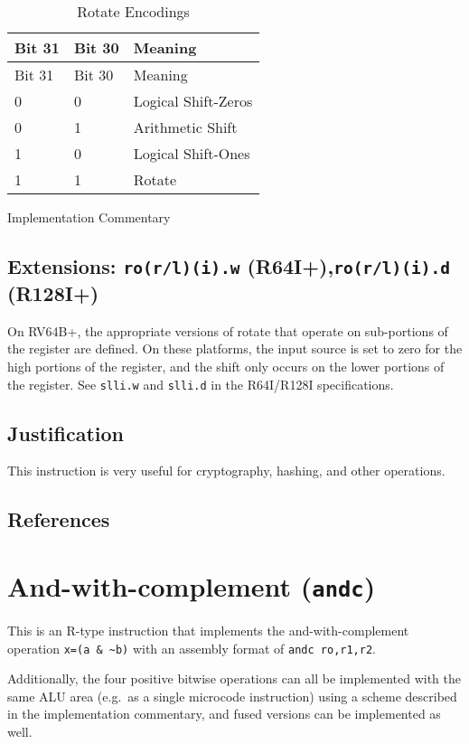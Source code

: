 \begin{longtable}[c]{@{}lll@{}}
\caption{Rotate Encodings}\tabularnewline
\toprule
Bit 31 & Bit 30 & Meaning\tabularnewline
\midrule
\endfirsthead
\toprule
Bit 31 & Bit 30 & Meaning\tabularnewline
\midrule
\endhead
0 & 0 & Logical Shift-Zeros\tabularnewline
0 & 1 & Arithmetic Shift\tabularnewline
1 & 0 & Logical Shift-Ones\tabularnewline
1 & 1 & Rotate\tabularnewline
\bottomrule
\end{longtable}

Implementation Commentary

\subsection{Extensions: \texttt{ro(r/l)(i).w} (R64I+),\texttt{ro(r/l)(i).d} (R128I+)}

On RV64B+, the appropriate versions of rotate that operate on
sub-portions of the register are defined. On these platforms, the input
source is set to zero for the high portions of the register, and the
shift only occurs on the lower portions of the register. See
\texttt{slli.w} and \texttt{slli.d} in the R64I/R128I specifications.

\subsection{Justification}

This instruction is very useful for cryptography, hashing, and other
operations.

\subsection{References}


\section{And-with-complement (\texttt{andc})}



This is an R-type instruction that implements the and-with-complement
operation \texttt{x=(a\ \&\ \textasciitilde{}b)} with an assembly format
of \texttt{andc\ ro,r1,r2}.

Additionally, the four positive bitwise operations can all be
implemented with the same ALU area (e.g.~as a single microcode
instruction) using a scheme described in the implementation commentary,
and fused versions can be implemented as well.

